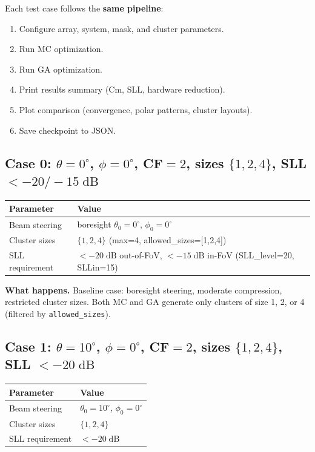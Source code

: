 \documentclass[11pt,a4paper]{article}
\begin{document}
Each test case follows the \textbf{same pipeline}:
\begin{enumerate}
    \item Configure array, system, mask, and cluster parameters.
    \item Run MC optimization.
    \item Run GA optimization.
    \item Print results summary (Cm, SLL, hardware reduction).
    \item Plot comparison (convergence, polar patterns, cluster layouts).
    \item Save checkpoint to JSON.
\end{enumerate}

\subsection{Case 0: $\theta=0^\circ$, $\phi=0^\circ$, CF$=2$, sizes $\{1,2,4\}$, SLL $< -20/-15\;\text{dB}$}

\begin{center}
\begin{tabular}{ll}
\toprule
\textbf{Parameter} & \textbf{Value} \\
\midrule
Beam steering & boresight $\theta_0 = 0^\circ$, $\phi_0 = 0^\circ$ \\
Cluster sizes & $\{1, 2, 4\}$ (max=4, allowed\_sizes=[1,2,4]) \\
SLL requirement & $< -20\;\text{dB}$ out-of-FoV, $< -15\;\text{dB}$ in-FoV (SLL\_level=20, SLLin=15) \\
\bottomrule
\end{tabular}
\end{center}

\textbf{What happens.}
Baseline case: boresight steering, moderate compression, restricted cluster sizes.
Both MC and GA generate only clusters of size 1, 2, or 4 (filtered by
\texttt{allowed\_sizes}).

\subsection{Case 1: $\theta=10^\circ$, $\phi=0^\circ$, CF$=2$, sizes $\{1,2,4\}$, SLL $< -20\;\text{dB}$}

\begin{center}
\begin{tabular}{ll}
\toprule
\textbf{Parameter} & \textbf{Value} \\
\midrule
Beam steering & $\theta_0 = 10^\circ$, $\phi_0 = 0^\circ$ \\
Cluster sizes & $\{1, 2, 4\}$ \\
SLL requirement & $< -20\;\text{dB}$ \\
\bottomrule
\end{tabular}
\end{center}
\end{document}
